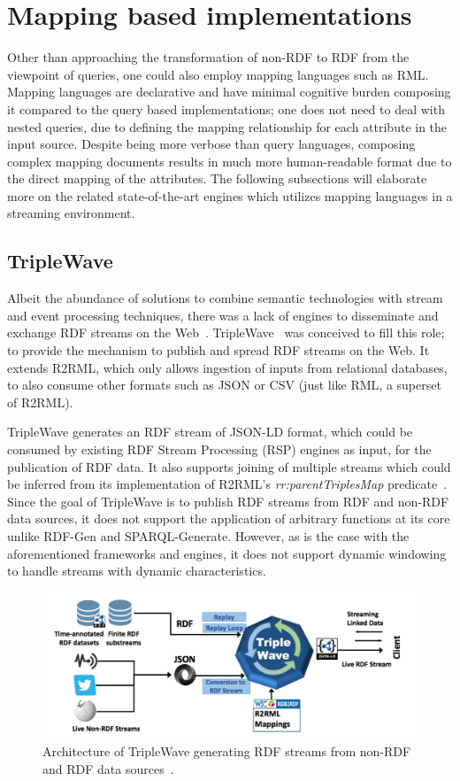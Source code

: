 \section{Mapping based implementations}
\label{sec:mapping_based_implementation}
Other than approaching the transformation of non-RDF to RDF from the viewpoint of 
queries, one could also employ mapping languages such as RML. Mapping languages 
are declarative and have minimal cognitive burden composing it compared to the
query based implementations; one does not need to deal with nested queries,
due to defining the mapping relationship for each attribute in 
the input source. Despite being more 
verbose than query languages, composing complex mapping documents results in much more human-readable 
format due to the direct mapping of the attributes. 
The following subsections will elaborate more on the related state-of-the-art engines 
which utilizes mapping languages in a streaming environment.

\subsection{TripleWave}
Albeit the abundance of solutions to combine semantic technologies with stream and event processing 
techniques, there was a lack of engines to disseminate and exchange RDF streams on the Web~\cite{triple_wave}. 
TripleWave~\cite{triple_wave} was conceived to fill this role; to provide the mechanism to publish and spread RDF streams on the Web. 
It extends R2RML, which only allows ingestion of inputs from relational databases, 
to also consume other formats such as JSON or CSV (just like RML, a superset of R2RML). 

TripleWave generates an RDF stream of JSON-LD format, which could be consumed by existing
RDF Stream Processing (RSP) engines as input, for the publication of RDF data.
It also supports joining of multiple streams which could be inferred from its implementation of R2RML's \emph{rr:parentTriplesMap} predicate~\cite{triple_wave}. Since the goal of TripleWave 
is to publish RDF streams from RDF and non-RDF data sources, it does not support the 
application of arbitrary functions at its core unlike RDF-Gen and SPARQL-Generate. 
However, as is the case with the aforementioned frameworks and engines, 
it does not support dynamic windowing to handle streams 
with dynamic characteristics. 


\begin{figure}[!htbp]
  \centering
  \includegraphics[width=\textwidth]{fig/triple-wave-arch.png}
  \caption{Architecture of TripleWave generating RDF streams from non-RDF and RDF data sources~\cite{triple_wave}. }
  \label{fig:triple-wave-arch}
\end{figure}

